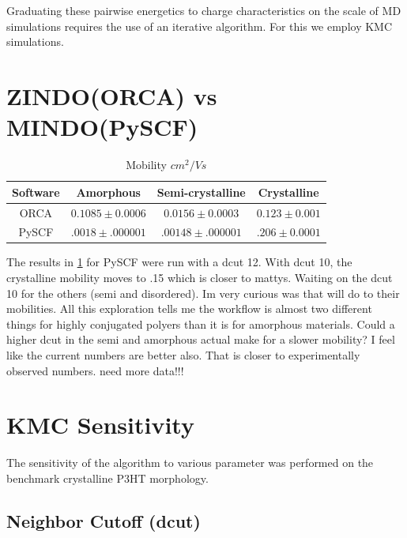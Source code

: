 Graduating these pairwise energetics to charge characteristics on the scale of MD simulations
requires the use of an iterative algorithm. For this we employ KMC simulations.

\section{ZINDO(ORCA) vs MINDO(PySCF)}

\begin{table}[ht]
    \caption{Mobility $cm^{2}/Vs$} %
\centering %
\begin{tabular}{c c c c} %
\hline\hline %
Software & Amorphous & Semi-crystalline & Crystalline \\ [0.5ex] %
\hline %
    ORCA & $0.1085 \pm 0.0006$ & $0.0156 \pm 0.0003$ & $0.123 \pm 0.001$ \\ %
PySCF & $.0018 \pm .000001$ & $.00148 \pm .000001$ & $.206 \pm 0.0001$ \\ [1ex] %
\hline %
\end{tabular}
\label{table:nonlin} %
\end{table}

The results in \ref{table:nonlin} for PySCF were run with a dcut 12. With dcut 10, the crystalline mobility
moves to .15 which is closer to mattys. Waiting on the dcut 10 for the others (semi and disordered). Im very
curious was that will do to their mobilities. All this exploration tells me the workflow is almost two
different things for highly conjugated polyers than it is for amorphous materials. Could a higher dcut in the
semi and amorphous actual make for a slower mobility? I feel like the current numbers are better also. That is
closer to experimentally observed numbers. need more data!!!


\section{KMC Sensitivity}

The sensitivity of the algorithm to various parameter was performed on the benchmark crystalline P3HT
morphology.

\subsection{Neighbor Cutoff (dcut)}

